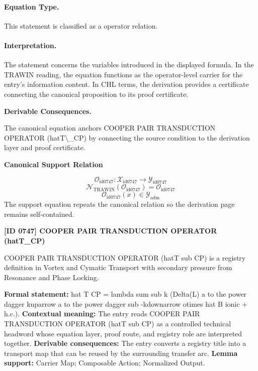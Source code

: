 \paragraph{Equation Type.}
This statement is classified as a operator relation.

\paragraph{Interpretation.}
The statement concerns the variables introduced in the displayed formula. In the TRAWIN reading, the equation functions as the operator-level carrier for the entry’s information content. In CHL terms, the derivation provides a certificate connecting the canonical proposition to its proof certificate.

\par\vspace{0.35em}
\noindent\textbf{Derivable Consequences.}\quad
\begingroup
\footnotesize
\raggedright
The canonical equation anchors COOPER PAIR TRANSDUCTION OPERATOR (hatT\textbackslash{}\_CP) by connecting the source condition to the derivation layer and proof certificate.
\par\endgroup

\noindent\textbf{Canonical Support Relation}\par
\[
\mathcal{O}_{\mathrm{id0747}}:\mathcal{X}_{\mathrm{id0747}}\longrightarrow\mathcal{Y}_{\mathrm{id0747}}
\]
\[
\mathcal{N}_{\mathrm{TRAWIN}}(\mathcal{O}_{\mathrm{id0747}})=\mathcal{O}_{\mathrm{id0747}}
\]
\[
\mathcal{O}_{\mathrm{id0747}}(x)\in\mathcal{Y}_{\mathrm{adm}}
\]
\noindent The support equation repeats the canonical relation so the derivation page remains self-contained.\par

\clearpage
\noindent\textbf{[ID 0747] COOPER PAIR TRANSDUCTION OPERATOR (hatT\_CP)}\par
\vspace{0.35em}
\begingroup\small
{}
COOPER PAIR TRANSDUCTION OPERATOR (hatT sub CP) is a registry definition in Vortex and Cymatic Transport with secondary pressure from Resonance and Phase Locking.

\begingroup\footnotesize\setlength{\emergencystretch}{3em}\sloppy
\textbf{Formal statement:} hat T CP = lambda sum sub k (Delta(L) a to the power dagger kuparrow a to the power dagger sub -kdownarrow otimes hat B ionic + h.c.). \textbf{Contextual meaning:} The entry reads COOPER PAIR TRANSDUCTION OPERATOR (hatT sub CP) as a controlled technical headword whose equation layer, proof route, and registry role are interpreted together. \textbf{Derivable consequences:} The entry converts a registry title into a transport map that can be reused by the surrounding transfer arc. \textbf{Lemma support:} Carrier Map; Composable Action; Normalized Output.\par
\endgroup

